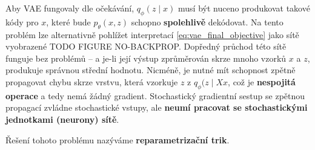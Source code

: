 Aby VAE fungovaly dle očekávání, $q_\phi(z\mid x)$ musí být nuceno produkovat takové kódy pro $x$, které bude $p_\theta(x, z)$ schopno \textbf{spolehlivě} dekódovat.
Na tento problém lze alternativně pohlížet interpretací \autoref{eq:vae_final_objective} jako sítě vyobrazené TODO FIGURE NO-BACKPROP.
Dopředný průchod této sítě funguje bez problémů – a je-li její výstup zprůměrován skrze mnoho vzorků $x$ a $z$, produkuje správnou střední hodnotu.
Nicméně, je nutné mít schopnost zpětně propagovat chybu skrze vrstvu, která vzorkuje $z$ z $q_\phi(z \mid Xx$, což je \textbf{nespojitá operace} a tedy nemá žádný gradient.
Stochastický gradientní sestup se zpětnou propagací zvládne stochastické vstupy, ale \textbf{neumí pracovat se stochastickými jednotkami (neurony) sítě}.

Řešení tohoto problému nazýváme \textbf{reparametrizační trik}.